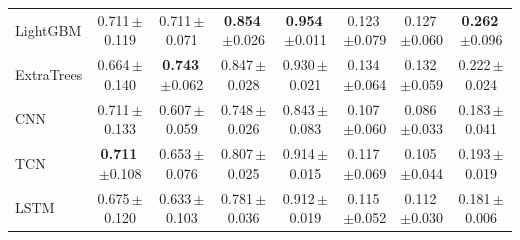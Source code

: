 \begin{tabular}{lccccccc}
\midrule
LightGBM & 0.711\,\scriptsize{$\pm$0.119} & 0.711\,\scriptsize{$\pm$0.071} & \textbf{0.854}\,\scriptsize{$\pm$0.026} & \textbf{0.954}\,\scriptsize{$\pm$0.011} & 0.123\,\scriptsize{$\pm$0.079} & 0.127\,\scriptsize{$\pm$0.060} & \textbf{0.262}\,\scriptsize{$\pm$0.096} \\
ExtraTrees & 0.664\,\scriptsize{$\pm$0.140} & \textbf{0.743}\,\scriptsize{$\pm$0.062} & 0.847\,\scriptsize{$\pm$0.028} & 0.930\,\scriptsize{$\pm$0.021} & 0.134\,\scriptsize{$\pm$0.064} & 0.132\,\scriptsize{$\pm$0.059} & 0.222\,\scriptsize{$\pm$0.024} \\
CNN & 0.711\,\scriptsize{$\pm$0.133} & 0.607\,\scriptsize{$\pm$0.059} & 0.748\,\scriptsize{$\pm$0.026} & 0.843\,\scriptsize{$\pm$0.083} & 0.107\,\scriptsize{$\pm$0.060} & 0.086\,\scriptsize{$\pm$0.033} & 0.183\,\scriptsize{$\pm$0.041} \\
TCN & \textbf{0.711}\,\scriptsize{$\pm$0.108} & 0.653\,\scriptsize{$\pm$0.076} & 0.807\,\scriptsize{$\pm$0.025} & 0.914\,\scriptsize{$\pm$0.015} & 0.117\,\scriptsize{$\pm$0.069} & 0.105\,\scriptsize{$\pm$0.044} & 0.193\,\scriptsize{$\pm$0.019} \\
LSTM & 0.675\,\scriptsize{$\pm$0.120} & 0.633\,\scriptsize{$\pm$0.103} & 0.781\,\scriptsize{$\pm$0.036} & 0.912\,\scriptsize{$\pm$0.019} & 0.115\,\scriptsize{$\pm$0.052} & 0.112\,\scriptsize{$\pm$0.030} & 0.181\,\scriptsize{$\pm$0.006} \\
\bottomrule
\end{tabular}
